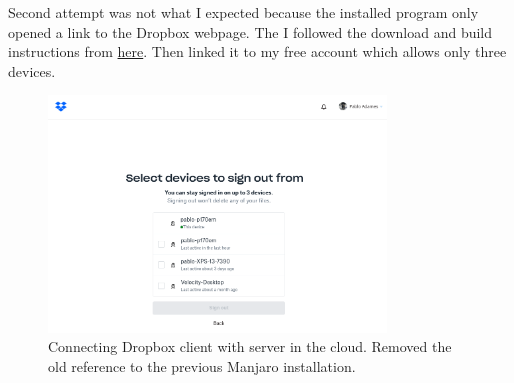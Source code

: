 \documentclass[]{scrartcl}
\begin{document}
Second attempt was not what I expected because the installed program only opened a link to the Dropbox webpage.
The I followed the download and build instructions from \href{https://help.dropbox.com/installs-integrations/desktop/linux-commands}{here}. 
Then linked it to my free account which allows only three devices.

\begin{figure}[!htb]
	\centering
	\caption{Connecting Dropbox client with server in the cloud. Removed the old reference to the previous Manjaro installation.}
	\includegraphics[width=0.8\textwidth]{Images/DropBoxSetUp.png}
\end{figure}
\end{document}
